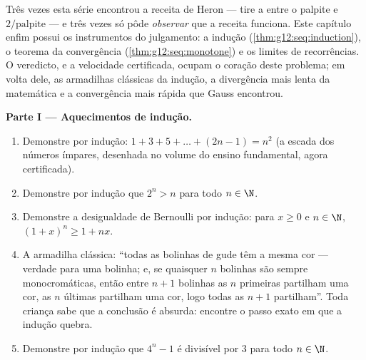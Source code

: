 \begin{problem}
\label{pb:g12:seq:1}
Três vezes esta série encontrou a receita de Heron --- tire a
 entre o palpite e $2/\text{palpite}$ --- e três vezes só
pôde \emph{observar} que a receita funciona. Este capítulo enfim
possui os instrumentos do julgamento: a indução
(\cref{thm:g12:seq:induction}), o teorema da convergência 
(\cref{thm:g12:seq:monotone}) e os limites de recorrências. O
veredicto, e a velocidade certificada, ocupam o coração deste
problema; em volta dele, as armadilhas clássicas da indução, a
divergência mais lenta da matemática e a convergência mais rápida
que Gauss encontrou.

\medskip
\noindent\textbf{Parte I --- Aquecimentos de indução.}
\begin{enumerate}
  \item Demonstre por indução:
        $1 + 3 + 5 + \dots + (2n - 1) = n^2$ (a escada dos
        números ímpares, desenhada no volume do ensino
        fundamental, agora certificada).
  \item Demonstre por indução que $2^n > n$ para todo $n \in \N$.
  \item Demonstre a desigualdade de Bernoulli por indução: para
        $x \geq 0$ e $n \in \N$, $(1 + x)^n \geq 1 + nx$.
  \item A armadilha clássica: ``todas as bolinhas de gude têm a
        mesma cor --- verdade para uma bolinha; e, se quaisquer
        $n$ bolinhas são sempre monocromáticas, então entre
        $n + 1$ bolinhas as $n$ primeiras partilham uma cor, as
        $n$ últimas partilham uma cor, logo todas as $n + 1$
        partilham''. Toda criança sabe que a conclusão é absurda:
        encontre o passo exato em que a indução quebra.
  \item Demonstre por indução que $4^n - 1$ é divisível por $3$
        para todo $n \in \N$.
\end{enumerate}


\end{problem}
